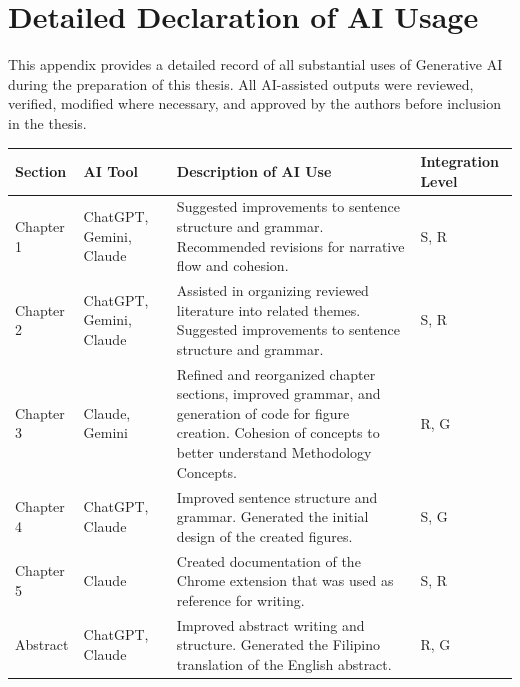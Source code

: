 \chapter{Detailed Declaration of AI Usage}
\label{sec:ai_usage}

This appendix provides a detailed record of all substantial uses of Generative AI during the preparation of this thesis. All AI-assisted outputs were reviewed, verified, modified where necessary, and approved by the authors before inclusion in the thesis.

\begin{longtable}{p{1.7cm} p{2.3cm} p{7.5cm} p{2cm}}

\toprule
\textbf{Section} &
\textbf{AI Tool} &
\textbf{Description of AI Use} &
\textbf{Integration Level} \\
\midrule
\endhead

Chapter 1 &
ChatGPT, Gemini, Claude &
Suggested improvements to sentence structure and grammar. Recommended revisions for narrative flow and cohesion. &
S, R \\

Chapter 2 &
ChatGPT, Gemini, Claude &
Assisted in organizing reviewed literature into related themes. Suggested improvements to sentence structure and grammar. &
S, R \\

Chapter 3 &
Claude, Gemini &
Refined and reorganized chapter sections, improved grammar, and generation of code for figure creation. Cohesion of concepts to better understand Methodology Concepts. &
R, G \\

Chapter 4 &
ChatGPT, Claude &
Improved sentence structure and grammar. Generated the initial design of the created figures. &
S, G \\

Chapter 5 &
Claude &
Created documentation of the Chrome extension that was used as reference for writing. &
S, R \\

Abstract &
ChatGPT, Claude &
Improved abstract writing and structure. Generated the Filipino translation of the English abstract. &
R, G \\

\bottomrule

\end{longtable}

